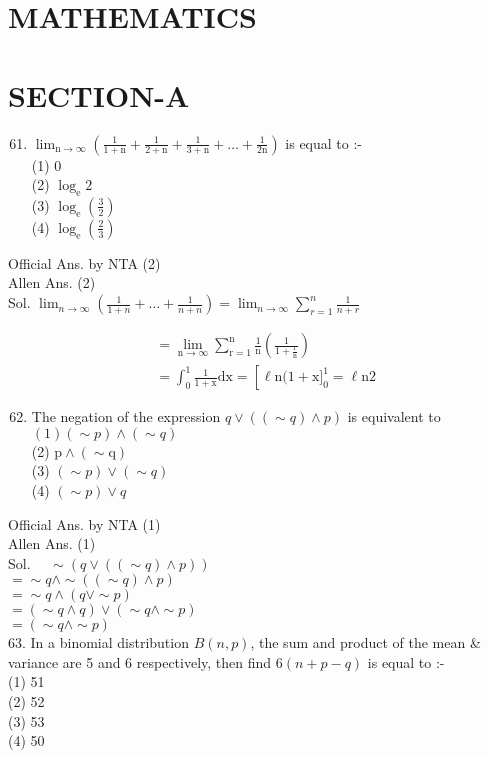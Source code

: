 \documentclass[10pt]{article}
\begin{document}
\section*{MATHEMATICS}
\section*{SECTION-A}
\begin{enumerate}
  \setcounter{enumi}{60}
  \item \(\lim _{\mathrm{n} \rightarrow \infty}\left(\frac{1}{1+\mathrm{n}}+\frac{1}{2+\mathrm{n}}+\frac{1}{3+\mathrm{n}}+\ldots+\frac{1}{2 \mathrm{n}}\right)\) is equal to :-\\
(1) 0\\
(2) \(\log _{\mathrm{e}} 2\)\\
(3) \(\log _{\mathrm{e}}\left(\frac{3}{2}\right)\)\\
(4) \(\log _{\mathrm{e}}\left(\frac{2}{3}\right)\)
\end{enumerate}

Official Ans. by NTA (2)\\
Allen Ans. (2)\\
Sol. \(\lim _{n \rightarrow \infty}\left(\frac{1}{1+n}+\ldots+\frac{1}{n+n}\right)=\lim _{n \rightarrow \infty} \sum_{r=1}^{n} \frac{1}{n+r}\)

\[
\begin{aligned}
& =\lim _{\mathrm{n} \rightarrow \infty} \sum_{\mathrm{r}=1}^{\mathrm{n}} \frac{1}{\mathrm{n}}\left(\frac{1}{1+\frac{\mathrm{r}}{\mathrm{n}}}\right) \\
& =\int_{0}^{1} \frac{1}{1+\mathrm{x}} \mathrm{dx}=\left[\ell \mathrm{n}(1+\mathrm{x}]_{0}^{1}=\ell \mathrm{n} 2\right.
\end{aligned}
\]

\begin{enumerate}
  \setcounter{enumi}{61}
  \item The negation of the expression \(q \vee((\sim q) \wedge p)\) is equivalent to\\
\((1)(\sim p) \wedge(\sim q)\)\\
(2) \(\mathrm{p} \wedge(\sim \mathrm{q})\)\\
(3) \((\sim p) \vee(\sim q)\)\\
(4) \((\sim p) \vee q\)
\end{enumerate}

Official Ans. by NTA (1)\\
Allen Ans. (1)\\
Sol. \(\quad \sim(q \vee((\sim q) \wedge p))\)\\
\(=\sim q \wedge \sim((\sim q) \wedge p)\)\\
\(=\sim q \wedge(q \vee \sim p)\)\\
\(=(\sim q \wedge q) \vee(\sim q \wedge \sim p)\)\\
\(=(\sim q \wedge \sim p)\)\\
63. In a binomial distribution \(B(n, p)\), the sum and product of the mean \& variance are 5 and 6 respectively, then find \(6(n+p-q)\) is equal to :-\\
(1) 51\\
(2) 52\\
(3) 53\\
(4) 50
\end{document}

